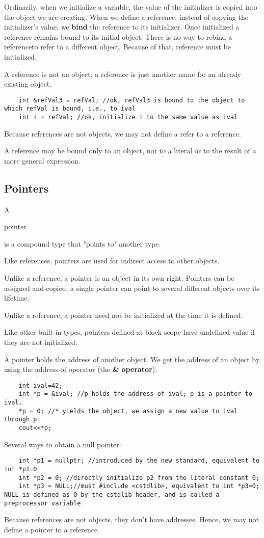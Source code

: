 \documentclass[UTF8]{ctexart}
\newcommand \qd[1] {\begin{qds} {#1} \end{qds}}
\begin{document}
Ordinarily, when we initialize a variable, the value of the initializer is copied into the object we are creating. When we define a reference, instead of copying the initializer's value, we \textbf{bind} the reference to its initializer. Once initialized a reference remains bound to its initial object. There is no way to rebind a referenceto refer to a different object. Because of that, reference must be initialized.

A reference is not an object, a reference is just another name for an already existing object.
\begin{lstlisting}
	int &refVal3 = refVal; //ok, refVal3 is bound to the object to which refVal is bound, i.e., to ival
	int i = refVal; //ok, initialize i to the same value as ival
\end{lstlisting}

Because references are not objects, we may not define a refer  to a reference.

A reference may be bound only to an object, not to a literal or to the result of a more general expression.

\subsection{Pointers}
A \qd{pointer} is a compound type that "points to" another type. 

Like references, pointers are used for indirect access to other objects.

Unlike a reference, a pointer is an object in its own right. Pointers can be assigned and copied; a single pointer can point to several different objects over its lifetime. 

Unlike a reference, a pointer need not be initialized at the time it is defined. 

Like other built-in types, pointers defined at block scope have undefined value if they are not initialized.

A pointer holds the address of another object. We get the address of an object by using the address-of operator (the \textbf{\& operator}).
\begin{lstlisting}
	int ival=42;
	int *p = &ival; //p holds the address of ival; p is a pointer to ival.
	*p = 0; //* yields the object, we assign a new value to ival through p
	cout<<*p;	
\end{lstlisting} 

Several ways to obtain a null pointer:
\begin{lstlisting}
	int *p1 = nullptr; //introduced by the new standard, equivalent to int *p1=0
	int *p2 = 0; //directly initialize p2 from the literal constant 0;
	int *p3 = NULL;//must #include <cstdlib>, equivalent to int *p3=0; NULL is defined as 0 by the cstdlib header, and is called a preprocessor variable
\end{lstlisting}
Because references are not objects, they don't have addresses. Hence, we may not define a pointer to a reference.
\end{document}
